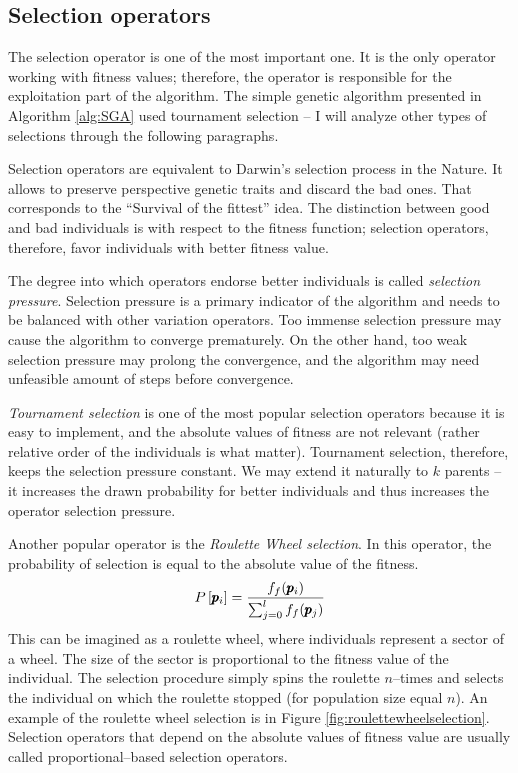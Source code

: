 \subsection{Selection operators}

The selection operator is one of the most important one. It is the only operator working with fitness values; therefore, the operator is responsible for the exploitation part of the algorithm. The simple genetic algorithm presented in Algorithm \ref{alg:SGA} used tournament selection -- I will analyze other types of selections through the following paragraphs.

Selection operators are equivalent to Darwin's selection process in the Nature. It allows to preserve perspective genetic traits and discard the bad ones. That corresponds to the \enquote{Survival of the fittest} idea. The distinction between good and bad individuals is with respect to the fitness function; selection operators, therefore, favor individuals with better fitness value.

The degree into which operators endorse better individuals is called \emph{selection pressure}. Selection pressure is a primary indicator of the algorithm and needs to be balanced with other variation operators. Too immense selection pressure may cause the algorithm to converge prematurely. On the other hand, too weak selection pressure may prolong the convergence, and the algorithm may need unfeasible amount of steps before convergence.

\emph{Tournament selection} is one of the most popular selection operators because it is easy to implement, and the absolute values of fitness are not relevant (rather relative order of the individuals is what matter). Tournament selection, therefore, keeps the selection pressure constant. We may extend it naturally to $k$ parents -- it increases the drawn probability for better individuals and thus increases the operator selection pressure.

Another popular operator is the \emph{Roulette Wheel selection}. In this operator, the probability of selection is equal to the absolute value of the fitness.
$$ P\left[\pmb{p}_i\right] = \frac{f_f(\pmb{p}_i)}{\sum_{j=0}^{l}f_f(\pmb{p}_j)} $$
This can be imagined as a roulette wheel, where individuals represent a sector of a wheel. The size of the sector is proportional to the fitness value of the individual. The selection procedure simply spins the roulette $n$--times and selects the individual on which the roulette stopped (for population size equal $n$). An example of the roulette wheel selection is in Figure \ref{fig:roulettewheelselection}. Selection operators that depend on the absolute values of fitness value are usually called proportional--based selection operators.


